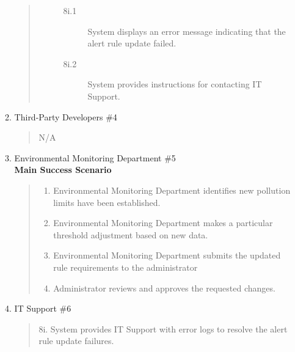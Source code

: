 \documentclass[]{article}
\begin{document}
\begin{enumerate}[{\bf BE2.}]
\begin{enumerate}[{\bf VP1.}]
\begin{quote}
\begin{description}
                        \begin{description}
                            \item[\textmd{8i.1}] System displays an error message indicating that the alert rule update failed.
                            \item[\textmd{8i.2}] System provides instructions for contacting IT Support.
                        \end{description}
                    \end{description}
                \end{quote}
                
			\item Third-Party Developers \#4
				\begin{quote}
				    N/A
				\end{quote}
                
			\item Environmental Monitoring Department \#5 \\
                \textbf{Main Success Scenario} 
                \begin{quote}
                \begin{enumerate}[1.]
                    \item Environmental Monitoring Department identifies new pollution limits have been established.
                    \item Environmental Monitoring Department makes a particular threshold adjustment based on new data.
                    \item Environmental Monitoring Department submits the updated rule requirements to the administrator
                    \item Administrator reviews and approves the requested changes.
                \end{enumerate}
                \end{quote}

			\item IT Support \#6
            	\begin{quote}
				    8i. System provides IT Support with error logs to resolve the alert rule update failures.
				\end{quote}

		\end{enumerate}
        

\end{enumerate}
\end{document}
